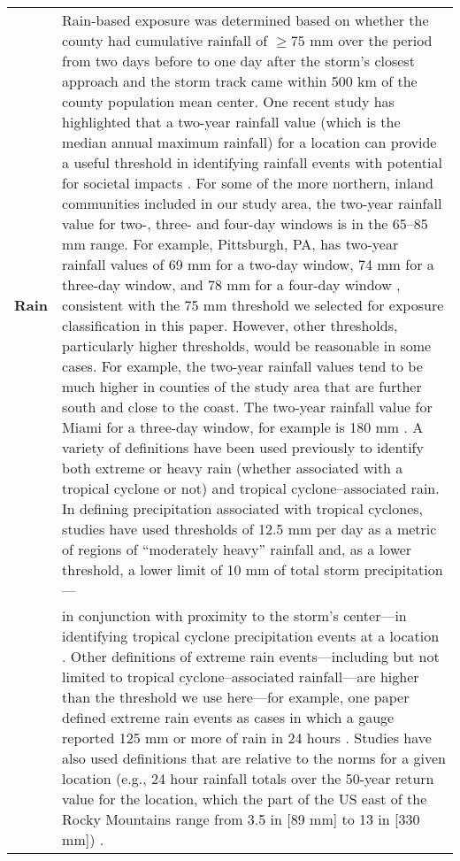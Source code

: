 \begin{longtable}{lp{35em}}
\textbf{Rain} & Rain-based exposure was determined based on whether the county had cumulative rainfall of $\ge75$ mm over the period from two days before to one day after the storm’s closest approach and the storm track came within 500 km of the county population mean center. One recent study has highlighted that a two-year rainfall value (which is the median annual maximum rainfall) for a location can provide a useful threshold in identifying rainfall events with potential for societal impacts \parencite{bosma2020intuitive}. For some of the more northern, inland communities included in our study area, the two-year rainfall value for two-, three- and four-day windows is in the 65--85 mm range. For example, Pittsburgh, PA, has two-year rainfall values of 69 mm for a two-day window, 74 mm for a three-day window, and 78 mm for a four-day window \parencite{noaaatlas}, consistent with the 75 mm threshold we selected for exposure classification in this paper. However, other thresholds, particularly higher thresholds, would be reasonable in some cases. For example, the two-year rainfall values tend to be much higher in counties of the study area that are further south and close to the coast. The two-year rainfall value for Miami for a three-day window, for example is 180 mm \parencite{noaaatlas}. A variety of definitions have been used previously to identify both extreme or heavy rain (whether associated with a tropical cyclone or not) and tropical cyclone--associated rain. In defining precipitation associated with tropical cyclones, studies have used thresholds of 12.5 mm per day as a metric of regions of ``moderately heavy'' rainfall \parencite{zhou2017spatial} and, as a lower threshold, a lower limit of 10 mm of total storm precipitation---\parfillskip=0pt\tabularnewline

&in conjunction with proximity to the storm's center---in identifying tropical cyclone precipitation events at a location \parencite{feldmann2019estimation}. Other definitions of extreme rain events---including but not limited to tropical cyclone--associated rainfall---are higher than the threshold we use here---for example, one paper defined extreme rain events as cases in which a gauge reported 125 mm or more of rain in 24 hours \parencite{schumacher2006characteristics}. Studies have also used definitions that are relative to the norms for a given location (e.g., 24 hour rainfall totals over the 50-year return value for the location, which the part of the US east of the Rocky Mountains range from 3.5 in [89 mm] to 13 in [330 mm]) \parencite{schumacher2006characteristics, schumacher2005organization, stevenson201410}.\\


\end{longtable}
